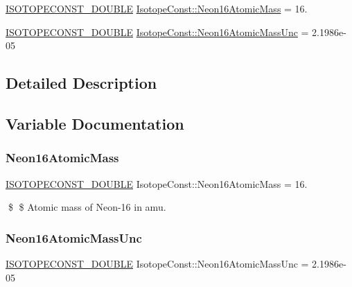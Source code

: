 \begin{DoxyCompactItemize}
\item 
\mbox{\hyperlink{group___isotope_const-_macros_ga8f45a7272ce02c0b4c65c44636ed719a}{I\+S\+O\+T\+O\+P\+E\+C\+O\+N\+S\+T\+\_\+\+D\+O\+U\+B\+LE}} \mbox{\hyperlink{group___isotope_const-_neon-_ne16_ga7b4d99f6b581a15729d4f61dcdb6d062}{Isotope\+Const\+::\+Neon16\+Atomic\+Mass}} = 16.
\item 
\mbox{\hyperlink{group___isotope_const-_macros_ga8f45a7272ce02c0b4c65c44636ed719a}{I\+S\+O\+T\+O\+P\+E\+C\+O\+N\+S\+T\+\_\+\+D\+O\+U\+B\+LE}} \mbox{\hyperlink{group___isotope_const-_neon-_ne16_gab649799af8a1770bd4a5e84870f03ea7}{Isotope\+Const\+::\+Neon16\+Atomic\+Mass\+Unc}} = 2.\+1986e-\/05
\end{DoxyCompactItemize}


\subsection{Detailed Description}


\subsection{Variable Documentation}
\mbox{\label{group___isotope_const-_neon-_ne16_ga7b4d99f6b581a15729d4f61dcdb6d062}} 
\subsubsection{\texorpdfstring{Neon16\+Atomic\+Mass}{Neon16AtomicMass}}
{\footnotesize\ttfamily \mbox{\hyperlink{group___isotope_const-_macros_ga8f45a7272ce02c0b4c65c44636ed719a}{I\+S\+O\+T\+O\+P\+E\+C\+O\+N\+S\+T\+\_\+\+D\+O\+U\+B\+LE}} Isotope\+Const\+::\+Neon16\+Atomic\+Mass = 16.}

\$ \$ Atomic mass of Neon-\/16 in amu. \mbox{\label{group___isotope_const-_neon-_ne16_gab649799af8a1770bd4a5e84870f03ea7}} 
\subsubsection{\texorpdfstring{Neon16\+Atomic\+Mass\+Unc}{Neon16AtomicMassUnc}}
{\footnotesize\ttfamily \mbox{\hyperlink{group___isotope_const-_macros_ga8f45a7272ce02c0b4c65c44636ed719a}{I\+S\+O\+T\+O\+P\+E\+C\+O\+N\+S\+T\+\_\+\+D\+O\+U\+B\+LE}} Isotope\+Const\+::\+Neon16\+Atomic\+Mass\+Unc = 2.\+1986e-\/05}

